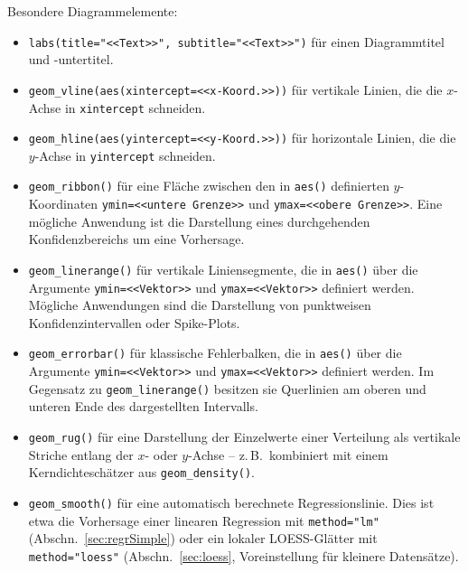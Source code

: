Besondere Diagrammelemente:
\begin{itemize}
\item {} \lstinline!labs(title="<<Text>>", subtitle="<<Text>>")! für einen Diagrammtitel und -untertitel.
\item {} \lstinline!geom_vline(aes(xintercept=<<x-Koord.>>))! für vertikale Linien, die die $x$-Achse in \lstinline!xintercept! schneiden.
\item {} \lstinline!geom_hline(aes(yintercept=<<y-Koord.>>))! für horizontale Linien, die die $y$-Achse in \lstinline!yintercept! schneiden.
\item {} \lstinline!geom_ribbon()! für eine Fläche zwischen den in \lstinline!aes()! definierten $y$-Koordinaten \lstinline!ymin=<<untere Grenze>>! und \lstinline!ymax=<<obere Grenze>>!. Eine mögliche Anwendung ist die Darstellung eines durchgehenden Konfidenzbereichs um eine Vorhersage.
\item {} \lstinline!geom_linerange()! für vertikale Liniensegmente, die in \lstinline!aes()! über die Argumente \lstinline!ymin=<<Vektor>>! und \lstinline!ymax=<<Vektor>>! definiert werden. Mögliche Anwendungen sind die Darstellung von punktweisen Konfidenzintervallen oder Spike-Plots.
\item {} \lstinline!geom_errorbar()! für klassische Fehlerbalken, die in \lstinline!aes()! über die Argumente \lstinline!ymin=<<Vektor>>! und \lstinline!ymax=<<Vektor>>! definiert werden. Im Gegensatz zu \lstinline!geom_linerange()! besitzen sie Querlinien am oberen und unteren Ende des dargestellten Intervalls.
\item {} \lstinline!geom_rug()! für eine Darstellung der Einzelwerte einer Verteilung als vertikale Striche entlang der $x$- oder $y$-Achse -- z.\,B.\ kombiniert mit einem Kerndichteschätzer aus \lstinline!geom_density()!.
\item {} \lstinline!geom_smooth()! für eine automatisch berechnete Regressionslinie. Dies ist etwa die Vorhersage einer linearen Regression mit \lstinline!method="lm"! (Abschn.\ \ref{sec:regrSimple}) oder ein lokaler LOESS-Glätter mit \lstinline!method="loess"! (Abschn.\ \ref{sec:loess}, Voreinstellung für kleinere Datensätze).

\end{itemize}
